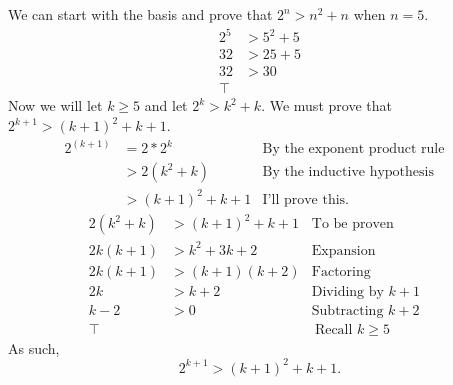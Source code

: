 \documentclass{article}
\begin{document}
\section{}
We can start with the basis and prove that $2^n > n^2 + n$ when $n=5$.
\begin{align*}
    2^5 &> 5^2 + 5 \\
    32 &> 25+5 \\
    32 &> 30 \\
    \top
\end{align*}
Now we will let $k \geq 5$ and let $2^k > k^2 + k$. We must prove that $2^{k+1} > (k+1)^2 + k + 1$.
\begin{align*}
    2^{(k+1)} &= 2 * 2^k & \text{By the exponent product rule}& \\
    &>2(k^2+k) & \text{By the inductive hypothesis}& \\
    &>(k+1)^2 +k+1 & \text{I'll prove this.}&
\end{align*}
\begin{align*}
    2(k^2+k) &> (k+1)^2 +k+1 &\text{To be proven}& \\
    2k(k+1) &> k^2 + 3k + 2 &\text{Expansion}&\\
    2k(k+1) &> (k+1)(k+2) &\text{Factoring}&\\
    2k &> k+2 &\text{Dividing by }k+1&\\
    k-2&>0 &\text{Subtracting }k+2&\\
    \top & &\ \text{Recall } k\geq 5&
\end{align*}
As such,
\begin{equation*}
    2^{k+1} > (k+1)^2 +k+1.
\end{equation*}
\rightline{$\blacksquare$}
\end{document}
